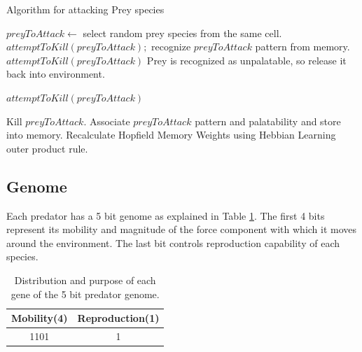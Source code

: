 \begin{algorithm}
	\caption{Algorithm for attacking Prey species}
	\label{algo:algorithm-attack-prey}
	\begin{algorithmic}
				\STATE $preyToAttack \gets$ select random prey species from the same cell.
					\STATE $attemptToKill(preyToAttack);$ 
				\ELSE
					\STATE recognize $preyToAttack$ pattern from memory.
						\STATE $attemptToKill(preyToAttack)$
					\ELSE 
						\STATE Prey is recognized as unpalatable, so release it back into environment.
					\ENDIF
				\ENDIF
			\ENDIF
		\ENDFOR
	\end{algorithmic}
\end{algorithm}

\begin{algorithm}
	\caption{$attemptToKill(preyToAttack)$}
	\label{algo:algorithm-attemptToKill}
	\begin{algorithmic}
		\STATE Kill $preyToAttack$.
		\IF {Memory size $< MaxMemorySize$}
			\STATE Associate $preyToAttack$ pattern and palatability and store into memory.
			\STATE Recalculate Hopfield Memory Weights using Hebbian Learning outer product rule.
		\ENDIF
	\end{algorithmic}	
\end{algorithm}

\subsection{Genome}
Each predator has a 5 bit genome as explained in Table \ref{tab:predator-genome}. The first 4 bits represent its mobility and magnitude of the force component with which it moves around the environment. The last bit controls reproduction capability of each species.

\begin{table}[H]
\centering
\begin{tabular}{|c|c|}
	\hline
		\textbf{Mobility(4)} & \textbf{Reproduction(1)} \\ \hline
				 1101					   &					1						 		\\ \hline
\end{tabular}
\caption{Distribution and purpose of each gene of the 5 bit predator genome.}
\label{tab:predator-genome}
\end{table}

